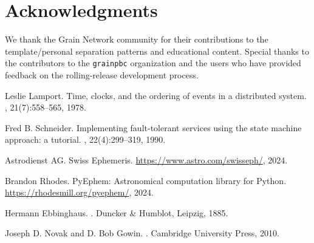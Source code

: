 \documentclass[11pt]{article}
\newcommand{\grainpbc}{\texttt{grainpbc}}
\begin{document}
\section*{Acknowledgments}

We thank the Grain Network community for their contributions to the template/personal separation patterns and educational content. Special thanks to the contributors to the \grainpbc{} organization and the users who have provided feedback on the rolling-release development process.


\begin{thebibliography}{9}

Leslie Lamport.
\newblock Time, clocks, and the ordering of events in a distributed system.
, 21(7):558--565, 1978.

Fred B. Schneider.
\newblock Implementing fault-tolerant services using the state machine approach: a tutorial.
, 22(4):299--319, 1990.

Astrodienst AG.
\newblock Swiss Ephemeris.
\newblock \url{https://www.astro.com/swisseph/}, 2024.

Brandon Rhodes.
\newblock PyEphem: Astronomical computation library for Python.
\newblock \url{https://rhodesmill.org/pyephem/}, 2024.

Hermann Ebbinghaus.
.
\newblock Duncker \& Humblot, Leipzig, 1885.

Joseph D. Novak and D. Bob Gowin.
.
\newblock Cambridge University Press, 2010.

\end{thebibliography}
\end{document}
